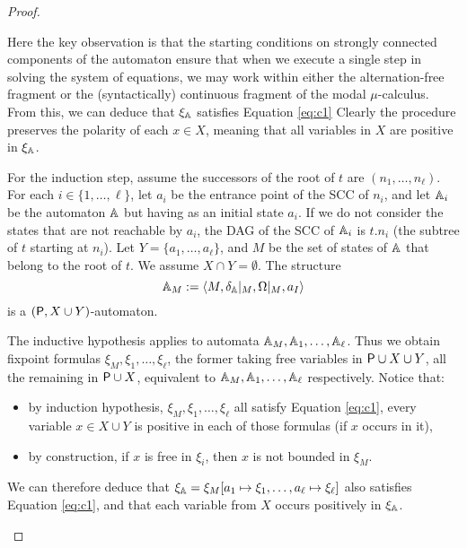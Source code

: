 \begin{proof}
\begin{pfclaim}
%
Here the key observation is that the starting conditions on
strongly connected components of the automaton ensure that when we execute
a single step in solving the system of equations, we 
may work within either the alternation-free fragment or the
(syntactically) continuous fragment of the modal $\mu$-calculus.
From this, we can deduce that $\xi_\mathbb{A}$ satisfies Equation \ref{eq:c1}
 Clearly the procedure preserves the polarity of each $x \in X$, meaning that all variables in $X$ are positive in $\xi_\mathbb{A}$.


For the induction step, assume the successors of the root of $t$ are $(n_1, \dots, n_\ell)$. For each $i \in \{1,\dots,\ell\}$, let $a_i$ be the entrance point of the SCC of $n_i$, and let $\mathbb{A}_{i}$ be the automaton $\mathbb{A}$ but having as an initial state $a_i$. If we do not consider the states that are not reachable by $a_i$, the DAG of the SCC of $\mathbb{A}_{i}$ is $t.{n_i}$ (the subtree of $t$ starting at $n_i$).
Let $Y=\{a_1, \dots, a_\ell\}$, and $M$ be the set of states of $\mathbb{A}$ that belong to the root of $t$. We assume $X \cap Y = \emptyset$. The structure
\[
\aut_M := \tup{M, \delta_\aut|_{M}, \pmap|_{M}, a_I}
\] is a $(\mathsf{P}, X \cup Y)$-automaton.

The inductive hypothesis applies to automata $\mathbb{A}_M, \mathbb{A}_{1}, \dots, \mathbb{A}_{\ell}$. Thus we obtain fixpoint formulas $\xi_M, \xi_1, \dots, \xi_\ell$, the former taking free variables in $\mathsf{P} \cup X \cup Y$, all the remaining in $\mathsf{P} \cup X$, equivalent to $\mathbb{A}_M, \mathbb{A}_1, \dots, \mathbb{A}_\ell$ respectively.
Notice that:
\begin{itemize}
\item by induction hypothesis, $\xi_M, \xi_1, \dots, \xi_\ell$ all satisfy Equation \ref{eq:c1}, every variable $x \in X \cup Y$ is positive in each of those formulas (if $x$ occurs in it),
\item by construction, if $x$ is free in $\xi_i$, then $x$ is not bounded in $\xi_{M}$.
\end{itemize}
 We can therefore deduce that
 $\xi_\mathbb{A}= \xi_{M}[a_1\mapsto\xi_{1}, \dots, a_\ell\mapsto\xi_{\ell}]$
also satisfies Equation \ref{eq:c1}, and that each variable from $X$ occurs positively in $\xi_\mathbb{A}$.


\end{pfclaim}
\end{proof}
